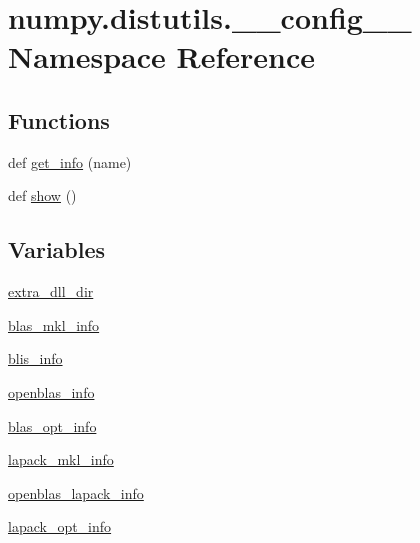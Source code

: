 \hypertarget{namespacenumpy_1_1distutils_1_1____config____}{}\section{numpy.\+distutils.\+\_\+\+\_\+config\+\_\+\+\_\+ Namespace Reference}
\label{namespacenumpy_1_1distutils_1_1____config____}
\subsection*{Functions}
\begin{DoxyCompactItemize}
\item 
def \hyperlink{namespacenumpy_1_1distutils_1_1____config_____a7907410297f40c910c2bde2a9fbfed3d}{get\+\_\+info} (name)
\item 
def \hyperlink{namespacenumpy_1_1distutils_1_1____config_____a8d0a314a1c2214e7b0ec28d4a19865eb}{show} ()
\end{DoxyCompactItemize}
\subsection*{Variables}
\begin{DoxyCompactItemize}
\item 
\hyperlink{namespacenumpy_1_1distutils_1_1____config_____aa146f2411b295e7c1c0996454a626e45}{extra\+\_\+dll\+\_\+dir}
\item 
\hyperlink{namespacenumpy_1_1distutils_1_1____config_____a80adce35b658ba404c96caf4ac6b5b34}{blas\+\_\+mkl\+\_\+info}
\item 
\hyperlink{namespacenumpy_1_1distutils_1_1____config_____ab66bb1576117ba8944a4f09b4ca4b36a}{blis\+\_\+info}
\item 
\hyperlink{namespacenumpy_1_1distutils_1_1____config_____aa64cbe9881af85428511bcd746ee853c}{openblas\+\_\+info}
\item 
\hyperlink{namespacenumpy_1_1distutils_1_1____config_____ab8dbeaaea8c831eb72972f8ac8bbadf9}{blas\+\_\+opt\+\_\+info}
\item 
\hyperlink{namespacenumpy_1_1distutils_1_1____config_____a30ea9cca05cbf67dc278e43e469a67a4}{lapack\+\_\+mkl\+\_\+info}
\item 
\hyperlink{namespacenumpy_1_1distutils_1_1____config_____a7b29df723caa045380f6f5fe02ecd162}{openblas\+\_\+lapack\+\_\+info}
\item 
\hyperlink{namespacenumpy_1_1distutils_1_1____config_____a74aac6b9efb163de33b8951373cd78aa}{lapack\+\_\+opt\+\_\+info}
\end{DoxyCompactItemize}


